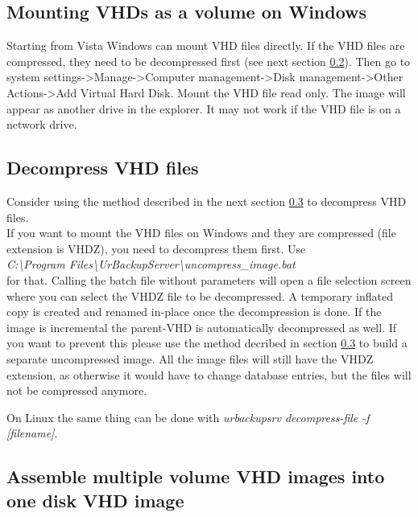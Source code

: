 \documentclass[a4paper,10pt]{article}
\begin{document}
\subsection{Mounting VHDs as a volume on Windows}

Starting from Vista Windows can mount VHD files directly. If the VHD files are compressed, they need to be
decompressed first (see next section \ref{decompress_vhd_files}). Then go to
system settings->Manage->Computer management->Disk management->Other Actions->Add Virtual Hard Disk. Mount
the VHD file read only. The image will appear as another drive in the explorer. It may not work if the VHD file
is on a network drive.

\subsection{Decompress VHD files}
\label{decompress_vhd_files}

Consider using the method described in the next section \ref{assemble_vhd_files} to decompress VHD files.\\


If you want to mount the VHD files on Windows and they are compressed (file extension is VHDZ), you need
to decompress them first. Use\\
\textsl{C:\textbackslash Program Files\textbackslash UrBackupServer\textbackslash uncompress\_image.bat}\\
 for that.
Calling the batch file without parameters will open a file selection screen where you can select the VHDZ
file to be decompressed. A temporary inflated copy is created and renamed in-place
once the decompression is done.
If the image is incremental the parent-VHD is automatically decompressed as well. If you want to prevent this
please use the method decribed in section \ref{assemble_vhd_files} to build a separate uncompressed image. All the image files will
still have the VHDZ extension, as otherwise it would have to change database entries, but the files will
not be compressed anymore.

\noindent On Linux the same thing can be done with \textsl{urbackupsrv decompress-file -f [filename]}.


\subsection{Assemble multiple volume VHD images into one disk VHD image}
\label{assemble_vhd_files}
\end{document}
